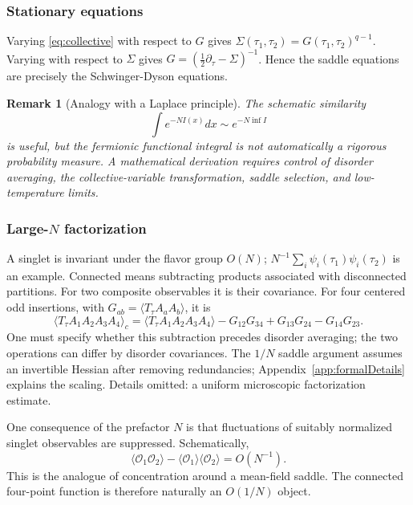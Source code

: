 \documentclass[11pt]{article}
\numberwithin{equation}{section}
\theoremstyle{exposition}
\newtheorem{remark}[definition]{Remark}
\theoremstyle{result}
\newcommand{\cO}{\mathcal O}
\begin{document}
\subsubsection{Stationary equations}

Varying \eqref{eq:collective} with respect to $G$ gives $\Sigma(\tau_1,\tau_2)=G(\tau_1,\tau_2)^{q-1}$. Varying with respect to $\Sigma$ gives $G=(\tfrac12\partial_\tau-\Sigma)^{-1}$. Hence the saddle equations are precisely the Schwinger-Dyson equations.

\begin{remark}[Analogy with a Laplace principle]
The schematic similarity
\begin{equation*}
\int e^{-NI(x)}dx\sim e^{-N\inf I}
\end{equation*}
is useful, but the fermionic functional integral is not automatically a rigorous probability measure. A mathematical derivation requires control of disorder averaging, the collective-variable transformation, saddle selection, and low-temperature limits.
\end{remark}

\subsubsection{Large-$N$ factorization}


A singlet is invariant under the flavor group $O(N)$; $N^{-1}\sum_i\psi_i(\tau_1)\psi_i(\tau_2)$ is an example. Connected means subtracting products associated with disconnected partitions. For two composite observables it is their covariance. For four centered odd insertions, with $G_{ab}=\langle T_\tau A_aA_b\rangle$, it is
\begin{equation*}
\langle T_\tau A_1A_2A_3A_4\rangle_c
=\langle T_\tau A_1A_2A_3A_4\rangle
-G_{12}G_{34}+G_{13}G_{24}-G_{14}G_{23}.
\end{equation*}
One must specify whether this subtraction precedes disorder averaging; the two operations can differ by disorder covariances. The $1/N$ saddle argument assumes an invertible Hessian after removing redundancies; Appendix~\ref{app:formalDetails} explains the scaling. Details omitted: a uniform microscopic factorization estimate.

One consequence of the prefactor $N$ is that fluctuations of suitably normalized singlet observables are suppressed. Schematically,
\begin{equation*}
\langle \cO_1\cO_2\rangle
-\langle\cO_1\rangle\langle\cO_2\rangle
=O(N^{-1}).
\end{equation*}
This is the analogue of concentration around a mean-field saddle. The connected four-point function is therefore naturally an $O(1/N)$ object.
\end{document}
